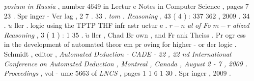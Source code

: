 \documentclass[10pt]{article}
\begin{document}
 {\small \textit{posium in Russia } , number 4649 in Lectur e Notes in Computer Science , pages 7 23 . } 
 {\small Spr inger - Ver lag , 2 7 . } 
 {\small 33 . }   
 {\small \textit{tom . Reasoning } , 43 ( 4 ) : 337 362 , 2009 . } 
 {\small 34 . }   $ \ddot{u} $  {\small ller . }  
 {\small logic using the TPTP THF infr astr uctur e . }   $ r-n $  {\small \textit{al of Fo } }  $ m-r $  {\small \textit{alized Reasoning } , } 
 {\small 3 ( 1 ) : 1 }  
 {\small 35 . }   $ \ddot{u} $  {\small ller , Chad Br own , and Fr ank Theiss . Pr ogr ess in } 
 {\small the development of automated theor em pr oving for higher - or der logic . }  
 {\small Schmidt , editor , \textit{Automated Deduction - CADE - 22 , 22 nd International Conference } } 
 {\small \textit{on Automated Deduction , Montreal , Canada , August 2 - 7 , 2009 . Proceedings } , vol - } 
 {\small ume 5663 of \textit{LNCS } , pages 1 1 6 1 30 . Spr inger , 2009 . } 
\end{document}
